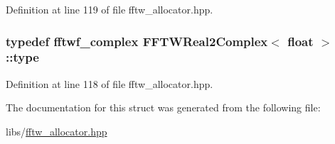 Definition at line 119 of file fftw\-\_\-allocator.\-hpp.

\hypertarget{struct_f_f_t_w_real2_complex_3_01float_01_4_aa0fdfacb991acafebd4366d8d96d89e2}{
\subsubsection[{type}]{\setlength{\rightskip}{0pt plus 5cm}typedef fftwf\-\_\-complex {\bf F\-F\-T\-W\-Real2\-Complex}$<$ float $>$\-::{\bf type}}}\label{struct_f_f_t_w_real2_complex_3_01float_01_4_aa0fdfacb991acafebd4366d8d96d89e2}


Definition at line 118 of file fftw\-\_\-allocator.\-hpp.



The documentation for this struct was generated from the following file\-:\begin{DoxyCompactItemize}
\item 
libs/\hyperlink{fftw__allocator_8hpp}{fftw\-\_\-allocator.\-hpp}\end{DoxyCompactItemize}
